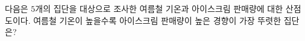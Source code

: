 다음은 $5$개의 집단을 대상으로 조사한 여름철 기온과 아이스크림 판매량에 대한 산점도이다. 여름철 기온이 높을수록 아이스크림 판매량이 높은 경향이 가장 뚜렷한 집단은? 
\begin{choicesii}{}{}{}{}{}\end{choicesii}
